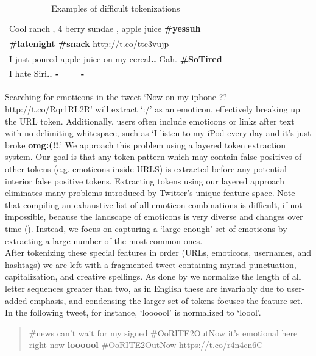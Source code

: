 \documentclass[letterpaper]{article}
\begin{document}
\begin{table}[h]
\centering
\begin{tabular}{|l|}
	\hline
	Cool ranch , 4 berry sundae , apple juice \textbf{\#yessuh} \\ 
	\textbf{\#latenight \#snack} http://t.co/ttc3vujp \\ \hline
	I just poured apple juice on my cereal\textbf{..} Gah. \textbf{\#SoTired} \\ \hline
	I hate Siri\textbf{.. -\_\_\_-} \\
	\hline
\end{tabular}
\caption{Examples of difficult tokenizations}
\label{tab:tokenization_examples}
\end{table}

Searching for emoticons in the tweet `Now on my iphone ?? http://t.co/Rqr1RL2R' will extract `:/' as an emoticon, effectively breaking up the URL token. Additionally, users often include emoticons or links after text with no delimiting whitespace, such as `I listen to my iPod every day and it's just broke \textbf{omg:(!!}.' We approach this problem using a layered token extraction system. Our goal is that any token pattern which may contain false positives of other tokens (e.g. emoticons inside URLS) is extracted before any potential interior false positive tokens. Extracting tokens using our layered approach eliminates many problems introduced by Twitter's unique feature space. Note that compiling an exhaustive list of all emoticon combinations is difficult, if not impossible, because the landscape of emoticons is very diverse and changes over time (\citeauthor{Laboreiro:2010:TMM:1871840.1871853}). Instead, we focus on capturing a `large enough' set of emoticons by extracting a large number of the most common ones. \\

After tokenizing these special features in order (URLs, emoticons, usernames, and hashtags) we are left with a fragmented tweet containing myriad punctuation, capitalization, and creative spellings. As done by \citet{potts2011} we normalize the length of all letter sequences greater than two, as in English these are invariably due to user-added emphasis, and condensing the larger set of tokens focuses the feature set. In the following tweet, for instance, `loooool' is normalized to `loool'.
\begin{quote}
\#news can't wait for my signed \#OoRITE2OutNow it's emotional here right now \textbf{loooool} \#OoRITE2OutNow https://t.co/r4n4cn6C 
\end{quote}
\end{document}
